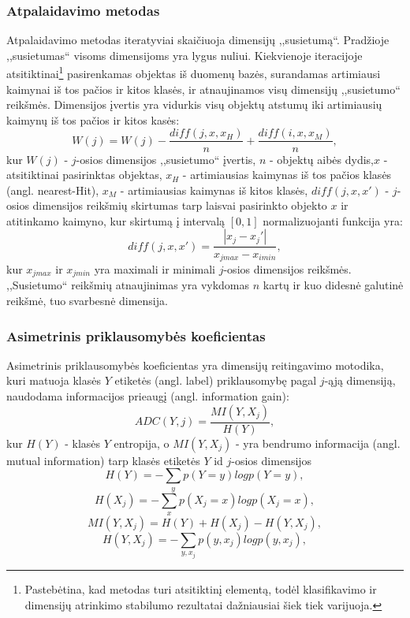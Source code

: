 \subsubsection{Atpalaidavimo metodas}

Atpalaidavimo metodas iteratyviai skaičiuoja dimensijų ,,susietumą``. Pradžioje
,,susietumas`` visoms dimensijoms yra lygus nuliui. Kiekvienoje
iteracijoje atsitiktinai\footnote{Pastebėtina, kad metodas 
turi atsitiktinį elementą, todėl klasifikavimo ir  dimensijų atrinkimo stabilumo
rezultatai dažniausiai šiek tiek varijuoja.} pasirenkamas objektas iš duomenų
bazės, surandamas
artimiausi kaimynai iš tos pačios ir kitos klasės, ir atnaujinamos visų 
dimensijų ,,susietumo`` reikšmės. Dimensijos įvertis yra vidurkis visų objektų
atstumų iki artimiausių kaimynų iš tos pačios ir kitos kasės:
\begin{equation}
 W(j)=W(j) - \frac{diff(j, x, x_H)}{n} + \frac{diff(i, x, x_M)}{n},
\end{equation}
kur $W(j)$ - $j$-osios dimensijos ,,susietumo`` įvertis, $n$ - objektų aibės 
dydis,$x$ - atsitiktinai pasirinktas objektas, $x_H$ - artimiausias
kaimynas iš tos pačios klasės (angl. nearest-Hit), $x_M$ - artimiausias kaimynas
iš kitos klasės, $diff(j, x, x')$ - $j$-osios dimensijos reikšmių skirtumas
tarp laisvai pasirinkto objekto $x$ ir atitinkamo kaimyno, kur skirtumą į
intervalą $[0, 1]$ normalizuojanti funkcija yra:
\begin{equation}
 diff(j, x, x')=\frac{|x_j- x_j'|}{x_{j max} - x_{i min}},
\end{equation}
kur $x_{j max}$ ir $x_{j min}$ yra maximali ir minimali $j$-osios dimensijos
reikšmės. ,,Susietumo`` reikšmių atnaujinimas yra vykdomas $n$ kartų ir kuo
didesnė galutinė reikšmė, tuo svarbesnė dimensija.

\subsubsection{Asimetrinis priklausomybės koeficientas}

Asimetrinis priklausomybės koeficientas yra dimensijų reitingavimo motodika,
kuri matuoja klasės $Y$ etiketės (angl. label) priklausomybę pagal $j$-ąją
dimensiją, naudodama informacijos prieaugį (angl. information gain):
\begin{equation}
 ADC(Y, j) = \frac{MI(Y, X_j)}{H(Y)},
\end{equation}
kur $H(Y)$ - klasės $Y$ entropija, o $MI(Y, X_j)$ - yra bendrumo informacija
(angl. mutual information) tarp klasės etiketės $Y$ id $j$-osios dimensijos
\begin{equation}
 H(Y)=-\sum_y{p(Y=y)log{p(Y=y)}}, 
\end{equation}
\begin{equation}
 H(X_j)=-\sum_x{p(X_j=x) log{p(X_j=x)}},
\end{equation}
\begin{equation}
 MI(Y, X_j) = H(Y) + H(X_j) - H(Y, X_j),
\end{equation}
\begin{equation}
 H(Y, X_j) = -\sum_{y,x_j}{p(y, x_j)log{p(y, x_j)}},
\end{equation}

